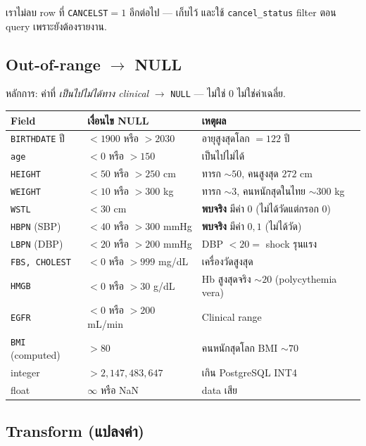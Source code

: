 \documentclass[11pt,a4paper]{article}
\begin{document}
\noindent เราไม่ลบ row ที่ \texttt{CANCELST}$=1$ อีกต่อไป — เก็บไว้
และใช้ \texttt{cancel\_status} filter ตอน query เพราะยังต้องรายงาน.

\subsection{Out-of-range $\rightarrow$ NULL}

หลักการ: ค่าที่ \textit{เป็นไปไม่ได้ทาง clinical} $\rightarrow$ \texttt{NULL} --- ไม่ใช่ 0 ไม่ใช่ค่าเฉลี่ย.

\begin{center}
\small
\begin{tabularx}{\linewidth}{l l X}
\toprule
\textbf{Field} & \textbf{เงื่อนไข NULL} & \textbf{เหตุผล} \\
\midrule
\texttt{BIRTHDATE} ปี & $< 1900$ หรือ $> 2030$ & อายุสูงสุดโลก $= 122$ ปี \\
\texttt{age}          & $< 0$ หรือ $> 150$ & เป็นไปไม่ได้ \\
\texttt{HEIGHT}       & $< 50$ หรือ $> 250$ cm & ทารก $\sim 50$, คนสูงสุด $272$ cm \\
\texttt{WEIGHT}       & $< 10$ หรือ $> 300$ kg & ทารก $\sim 3$, คนหนักสุดในไทย $\sim 300$ kg \\
\texttt{WSTL}         & $< 30$ cm & \textbf{พบจริง} มีค่า $0$ (ไม่ได้วัดแต่กรอก 0) \\
\texttt{HBPN} (SBP)   & $< 40$ หรือ $> 300$ mmHg & \textbf{พบจริง} มีค่า $0, 1$ (ไม่ได้วัด) \\
\texttt{LBPN} (DBP)   & $< 20$ หรือ $> 200$ mmHg & DBP $< 20 =$ shock รุนแรง \\
\texttt{FBS, CHOLEST} & $< 0$ หรือ $> 999$ mg/dL & เครื่องวัดสูงสุด \\
\texttt{HMGB}         & $< 0$ หรือ $> 30$ g/dL & Hb สูงสุดจริง $\sim 20$ (polycythemia vera) \\
\texttt{EGFR}         & $< 0$ หรือ $> 200$ mL/min & Clinical range \\
\texttt{BMI} (computed) & $> 80$ & คนหนักสุดโลก BMI $\sim 70$ \\
integer               & $> 2{,}147{,}483{,}647$ & เกิน PostgreSQL INT4 \\
float                 & $\infty$ หรือ NaN & data เสีย \\
\bottomrule
\end{tabularx}
\end{center}

\subsection{Transform (แปลงค่า)}
\end{document}
